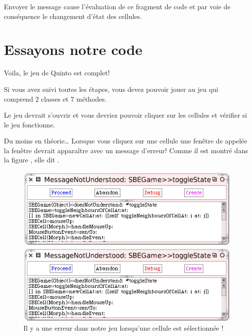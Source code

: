 \documentclass[a4paper,10pt,twoside]{book}
\begin{document}

\noindent
Envoyer le message  cause l'évaluation de ce fragment de code et par voie de conséquence le changement d'état des cellules.

\section{Essayons notre code}

Voila, le jeu de Quinto est complet!

Si vous avez suivi toutes les étapes, vous devez pouvoir jouer au jeu qui comprend 2 classes et 7 méthodes.


Le jeu devrait s'ouvrir et vous devriez pouvoir cliquer sur les cellules et vérifier si le jeu fonctionne.

Du moins en théorie\ldots{}
Lorsque vous cliquez sur une cellule une fenêtre de  appelée la fenêtre  devrait apparaître avec un message d'erreur!
Comme il est montré dans la figure , elle dit .

\begin{figure}[ht]
\ifluluelse
	{\centerline{\includegraphics[width=\textwidth]{Error}}}
	{\centerline{\includegraphics[scale=0.7]{Error}}}
\caption{Il y a une erreur dans notre jeu lorsqu'une cellule est sélectionnée !
\label{fig:quintoError}}
\end{figure}
\end{document}

